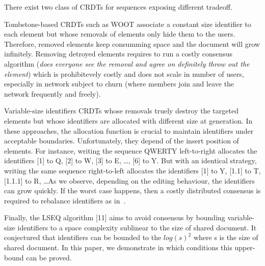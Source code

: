 \begin{asparadesc}
  There exist two class of CRDTs for sequences exposing different
  tradeoff.
\item [Tombstone-based] CRDTs such as WOOT\cite{oster2006data}
  associate a constant size identifier to each element but whose
  removals of elements only hide them to the users. Therefore, removed
  elements keep consumming space and the document will grow
  infinitely. Removing detroyed elements requires to run a costly
  consensus algorithm (\emph{does everyone see the removal and agree
    on definitely throw out the element}) which is prohibitevely
  costly and does not scale in number of users, especially in network
  subject to churn (where members join and leave the network
  frequently and freely).

\item [Variable-size identifiers] CRDTs whose removals truely destroy
  the targeted elements but whose identifiers are allocated with
  different size at generation. In these approaches, the allocation
  function is crucial to maintain identifiers under acceptable
  boundaries. Unfortunately, they depend of the insert position of
  elements. For instance, writing the sequence QWERTY left-to-right
  allocates the identifiers [1] to Q, [2] to W, [3] to E, \ldots, [6]
  to Y. But with an identical strategy, writing the same sequence
  right-to-left allocates the identifiers [1] to Y, [1.1] to T,
  [1.1.1] to R, \ldots As we observe, depending on the editing
  behaviour, the identifiers can grow quickly.  If the worst case
  happens, then a costly distributed consensus is required to
  rebalance identifiers as in~\cite{zawirskiasynchronous}.

Finally, the LSEQ algorithm [11] aims to avoid consensus by bounding
variable- size identifiers to a space complexity sublinear to the size
of shared document. It conjectured that identifiers can be bounded to
the $log(s)^2$ where s is the size of shared document. In this paper,
we demonstrate in which conditions  this upper-bound can be proved.

\end{asparadesc}

